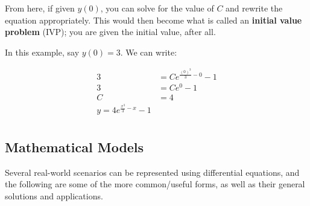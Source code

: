 \documentclass[12pt]{article}
\begin{document}
From here, if given $y(0)$, you can solve for the value of $C$ and rewrite the equation appropriately. This would then become what is called an \textbf{initial value problem} (IVP); you are given the initial value, after all. 

In this example, say $y(0) = 3$. We can write:

\begin{equation}
    \begin{split}
        3 &= Ce^{\frac{(0)^3}{3}-0}-1\\
        3 &= Ce^0-1\\
        C &= 4\\
        y = 4e^{\frac{x^3}{3}-x}-1\\
    \end{split}
\end{equation}

\subsection{Mathematical Models}

Several real-world scenarios can be represented using differential equations, and the following are some of the more common/useful forms, as well as their general solutions and applications.
\end{document}
